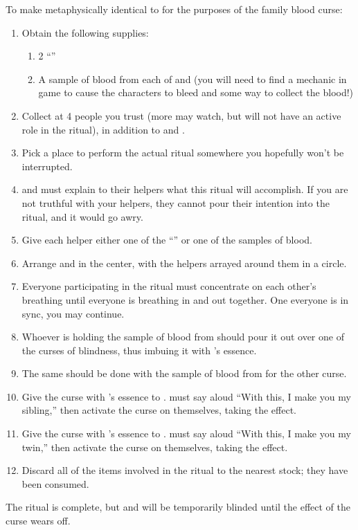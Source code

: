 \documentclass[green]{GL2020}
\begin{document}
To make \cAmbition{} metaphysically identical to \cHeir{} for the purposes of the \cFaledonParent{\formal} family blood curse:
\begin{enumerate}
  \item Obtain the following supplies:
  \begin{enumerate}
    \item 2 ``\iBlindness{}''
    \item A sample of blood from each of \cHeir{} and \cAmbition{} (you will need to find a mechanic in game to cause the characters to bleed and some way to collect the blood!)
  \end{enumerate}
  \item Collect at 4 people you trust (more may watch, but will not have an active role in the ritual), in addition to \cHeir{} and \cAmbition{}.
  \item Pick a place to perform the actual ritual somewhere you hopefully won’t be interrupted.
  \item \cHeir{} and \cAmbition{} must explain to their helpers what this ritual will accomplish. If you are not truthful with your helpers, they cannot pour their intention into the ritual, and it would go awry.
  \item Give each helper either one of the ``\iBlindness{}'' or one of the samples of blood. 
  \item Arrange \cHeir{} and \cAmbition{} in the center, with the helpers arrayed around them in a circle.
  \item Everyone participating in the ritual must concentrate on each other’s breathing until everyone is breathing in and out together.  One everyone is in sync, you may continue.
  \item Whoever is holding the sample of blood from \cHeir{} should pour it out over one of the curses of blindness, thus imbuing it with \cHeir{}’s essence.
  \item The same should be done with the sample of blood from \cAmbition{} for the other curse.
  \item Give the curse with \cHeir{}’s essence to \cAmbition{}. \cAmbition{} must say aloud ``With this, I make you my sibling,'' then activate the curse on themselves, taking the effect.
  \item Give the curse with \cAmbition{}’s essence to \cHeir{}. \cHeir{} must say aloud ``With this, I make you my twin,'' then activate the curse on themselves, taking the effect.
  \item Discard all of the items involved in the ritual to the nearest stock; they have been consumed.
\end{enumerate}

The ritual is complete, but \cHeir{} and \cAmbition{} will be temporarily blinded until the effect of the curse wears off.
\end{document}
